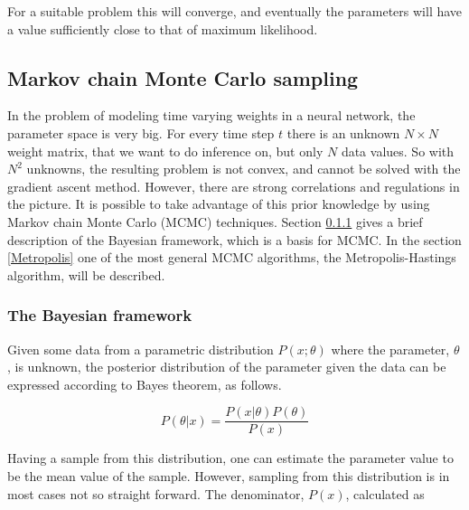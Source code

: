 For a suitable problem this will converge, and eventually the parameters will have a value sufficiently close to that of maximum likelihood.



\subsection{Markov chain Monte Carlo sampling}
In the problem of modeling time varying weights in a neural network, the parameter space is very big. For every time step $t$ there is an unknown $N \times N$ weight matrix, that we want to do inference on, but only $N$ data values. So with $N^2$ unknowns, the resulting problem is not convex, and cannot be solved with the gradient ascent method. However, there are strong correlations and regulations in the picture. It is possible to take advantage of this prior knowledge by using Markov chain Monte Carlo (MCMC) techniques. Section \ref{Bayesian} gives a brief description of the Bayesian framework, which is a basis for MCMC. In the section \ref{Metropolis} one of the most general MCMC algorithms, the  Metropolis-Hastings algorithm, will be described. 
\subsubsection{The Bayesian framework}
\label{Bayesian}

Given some data from a parametric distribution $P(x;\theta)$ where the parameter, $\theta$, is unknown, the posterior distribution of the parameter given the data can be expressed according to Bayes theorem, as follows.

\begin{equation}
    P(\theta | x) = \frac{P(x|\theta)P(\theta)}{P(x)}
\end{equation}

Having a sample from this distribution, one can estimate the parameter value to be the mean value of the sample. However, sampling from this distribution is in most cases not so straight forward. The denominator, $P(x)$, calculated as

